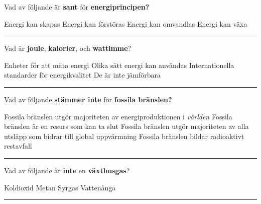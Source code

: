 \documentclass{exam}
\begin{document}
\vspace{5mm} %
\begin{center}
\end{center}
\vspace{5mm} %

\begin{questions}

\question Vad av följande är \textbf{sant} för \textbf{energiprincipen?}
\begin{checkboxes}
   \choice Energi kan skapas
   \choice Energi kan förstöras
   \correctchoice Energi kan omvandlas
   \choice Energi kan växa
\end{checkboxes}

\vspace{5mm} 
\hrule 
\vspace{5mm} 

\question Vad är \textbf{joule}, \textbf{kalorier}, och \textbf{wattimme}?
\begin{checkboxes}
   \correctchoice Enheter för att mäta energi
   \choice Olika sätt energi kan användas
   \choice Internationella standarder för energikvalitet
   \choice De är inte jämförbara
\end{checkboxes}

\vspace{5mm} 
\hrule 
\vspace{5mm} 

\question Vad av följande \textbf{stämmer inte} för \textbf{fossila bränslen?}
\begin{checkboxes}
   \choice Fossila bränslen utgör majoriteten av energiproduktionen i \textit{världen}
   \choice Fossila bränslen är en resurs som kan ta slut
   \choice Fossila bränslen utgör majoriteten av alla utsläpp som bidrar till global uppvärmning
   \correctchoice Fossila bränslen bildar radioaktivt restavfall
\end{checkboxes}

\vspace{5mm} 
\hrule 
\vspace{5mm} 

\question Vad av följande är \textbf{inte} en \textbf{växthusgas}?
\begin{checkboxes}
   \choice Koldioxid
   \choice Metan
   \correctchoice Syrgas
   \choice Vattenånga
\end{checkboxes}
\vspace{5mm} 
\hrule 
\vspace{5mm} 


\end{questions}
\end{document}
